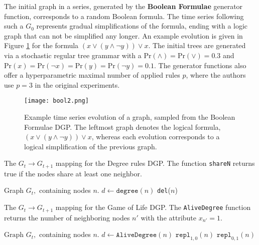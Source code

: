The initial graph in a series, generated by the \textbf{Boolean Formulae} generator function, corresponds to a random Boolean formula. The time series following such a $G_{0}$ represents gradual simplifications of the formula, ending with a logic graph that can not be simplified any longer. An example evolution is given in Figure \ref{fig:bool} for the formula  $(x \lor (y \land \lnot y)) \lor x$. The initial trees are generated via a stochastic regular tree grammar with a $\text{Pr}(\land) = \text{Pr}(\lor) = 0.3$ and $\text{Pr}(x) = \text{Pr}(\lnot x) = \text{Pr}(y) = \text{Pr}(\lnot y) = 0.1$. The generator functions also offer a hyperparametric maximal number of applied rules $p$, where the authors use $p=3$ in the original experiments.

\begin{figure}
    \centering
    \texttt{[image: bool2.png]}
    \caption{Example time series evolution of a graph, sampled from the Boolean Formulae DGP. The leftmost graph denotes the logical formula, $(x \lor (y \land \lnot y)) \lor x$, whereas each evolution corresponds to a logical simplification of the previous graph. }
    \label{fig:bool}
\end{figure}

\begin{algorithm}[H]
\centering
\caption{The $G_{t} \to G_{t+1}$ mapping for the Degree rules DGP. The function \texttt{shareN} returns true if the nodes share at least one neighbor.}\label{alg:degree}
\begin{algorithmic}[1]
\Require Graph $G_{t},$ containing nodes $n$.
\State $d \gets \texttt{degree}(n)$
 \texttt{del}($n$)
\EndMyFor
{}
\EndIf
\EndMyFor
\EndMyFor
\end{algorithmic}
\end{algorithm}

\begin{algorithm}[H]
    \centering
    \caption{The $G_{t} \to G_{t+1}$ mapping for the Game of Life DGP. The \texttt{AliveDegree} function returns the number of neighboring nodes $n'$ with the attribute $x_{n'}=1$. }\label{alg:gol}
   \begin{algorithmic}[1]
\Require $\text{Graph } G_{t}, $ containing nodes $n$.
    \State $d \gets \texttt{AliveDegree}(n)$
        \State $\texttt{repl}_{1,0}(n)$
        \State $\texttt{repl}_{0,1}(n)$
\EndIf
\EndMyFor
\end{algorithmic}
\end{algorithm}


